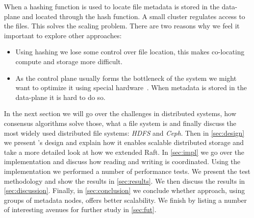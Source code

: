 When a hashing function is used to locate file metadata is stored in the data-plane and located through the hash function. A small cluster regulates access to the files. This solves the scaling problem. There are two reasons why we feel it important to explore other approaches:
\begin{itemize}
	\item Using hashing we lose some control over file location, this makes co-locating compute and storage more difficult.
	\item As the control plane usually forms the bottleneck of the system we might want to optimize it using special hardware~\cite{polarfs}. When metadata is stored in the data-plane it is hard to do so.
\end{itemize}

In the next section we will go over the challenges in distributed systems, how consensus algorithms solve those, what a file system is and finally discuss the most widely used distributed file systems: \textit{HDFS} and \textit{Ceph}. 
%
Then in \cref{sec:design} we present \name{}'s design and explain how it enables scalable distributed storage and take a more detailed look at how we extended Raft.
%
In \cref{sec:impl} we go over the implementation and discuss how reading and writing is coordinated.
%
Using the \name{} implementation we performed a number of performance tests. We present the test methodology and show the results in \cref{sec:results}.
% 
We then discuss the results in \cref{sec:discussion}.
%
Finally, in \cref{sec:conclusion} we conclude whether \name{} approach, using groups of metadata nodes, offers better scalability. 
%
We finish by listing a number of interesting avenues for further study in \cref{sec:fut}.
